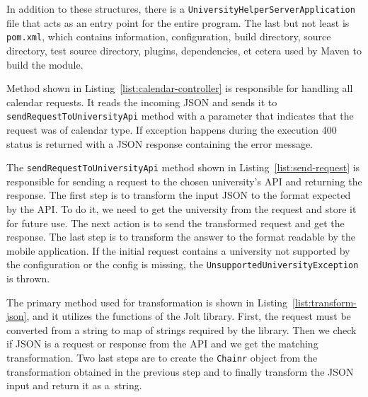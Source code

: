 In addition to these structures, there is a \texttt{UniversityHelperServerApplication} file that acts as an entry point for the entire program. The last but not least is \texttt{pom.xml}, which contains information, configuration, build directory, source directory, test source directory, plugins, dependencies, et cetera used by Maven to build the module.

Method shown in Listing~\ref{list:calendar-controller} is responsible for handling all calendar requests. It reads the incoming JSON and sends it to \texttt{sendRequestToUniversityApi} method with a parameter that indicates that the request was of calendar type. If exception happens during the execution 400 status is returned with a JSON response containing the error message.



The \texttt{sendRequestToUniversityApi} method shown in Listing~\ref{list:send-request} is responsible for sending a request to the chosen university's API and returning the response. The first step is to transform the input JSON to the format expected by the API. To do it, we need to get the university from the request and store it for future use. The next action is to send the transformed request and get the response. The last step is to transform the answer to the format readable by the mobile application. If the initial request contains a university not supported by the configuration or the config is missing, the \texttt{UnsupportedUniversityException} is thrown.



The primary method used for transformation is shown in Listing~\ref{list:transform-json}, and it utilizes the functions of the Jolt library. First, the request must be converted from a string to map of strings required by the library. Then we check if JSON is a request or response from the API and we get the matching transformation. Two last steps are to create the \texttt{Chainr} object from the transformation obtained in the previous step and to finally transform the JSON input and return it as a~string.



